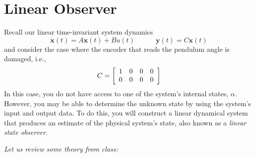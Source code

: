 \section{Linear Observer}\label{section:lab3_observer}
Recall our linear time-invariant system dynamics
\[\mathbf{\dot{x}}(t)=A\mathbf{x}(t)+Bu(t) \quad \quad \quad \mathbf{y}(t)=C\mathbf{x}(t)\]
and consider the case where the encoder that reads the pendulum angle is damaged, i.e.,
\[C = \left[\begin{array}{c c c c}
            1 & 0 & 0 & 0 \\
            0 & 0 & 0 & 0
        \end{array}\right]\]
In this case, you do not have access to one of the system's internal states, $\alpha$. However, you may be able to determine the unknown state by using the system's input and output data. To do this, you will construct a linear dynamical system that produces an estimate of the physical system's state, also known as a \emph{linear state observer}.

\noindent \emph{Let us review some theory from class:}

